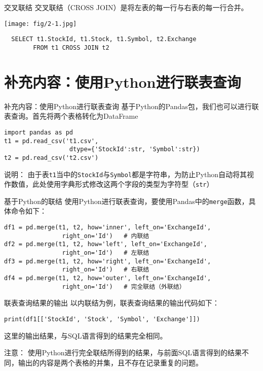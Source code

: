 \documentclass[t]{beamer}
\begin{document}
\begin{frame}[fragile]{交叉联结}
  交叉联结（CROSS JOIN）是将左表的每一行与右表的每一行合并。
\begin{center}
\texttt{[image: fig/2-1.jpg]}
\end{center}
\begin{lstlisting}
  SELECT t1.StockId, t1.Stock, t1.Symbol, t2.Exchange 
        FROM t1 CROSS JOIN t2 
\end{lstlisting}

\end{frame}

\section{补充内容：使用Python进行联表查询}
\begin{frame}[fragile]{补充内容：使用Python进行联表查询}
基于Python的Pandas包，我们也可以进行联表查询。首先将两个表格转化为DataFrame
\begin{lstlisting}
import pandas as pd
t1 = pd.read_csv('t1.csv', 
                  dtype={'StockId':str, 'Symbol':str})
t2 = pd.read_csv('t2.csv')
\end{lstlisting}

\begin{block}{说明：}
  由于表\verb|t1|当中的\verb|StockId|与\verb|Symbol|都是字符串，为防止Python自动将其视作数值，此处使用字典形式修改这两个字段的类型为字符型（\verb|str|）
\end{block}
\end{frame}

\begin{frame}[fragile]{基于Python的联结}
使用Python进行联表查询，要使用Pandas中的\verb|merge|函数，具体命令如下：
\begin{lstlisting}
df1 = pd.merge(t1, t2, how='inner', left_on='ExchangeId',
                right_on='Id')   # 内联结
df2 = pd.merge(t1, t2, how='left', left_on='ExchangeId',
                right_on='Id')   # 左联结
df3 = pd.merge(t1, t2, how='right', left_on='ExchangeId',
                right_on='Id')   # 右联结
df4 = pd.merge(t1, t2, how='outer', left_on='ExchangeId',
                right_on='Id')   # 完全联结（外联结）
\end{lstlisting}
\end{frame}

\begin{frame}[fragile]{联表查询结果的输出}
以内联结为例，联表查询结果的输出代码如下：
\begin{lstlisting}
print(df1[['StockId', 'Stock', 'Symbol', 'Exchange']])
\end{lstlisting}
这里的输出结果，与SQL语言得到的结果完全相同。

\begin{block}{注意：}
  使用Python进行完全联结所得到的结果，与前面SQL语言得到的结果不同，输出的内容是两个表格的并集，且不存在记录重复的问题。
\end{block}
\end{frame}
\end{document}
